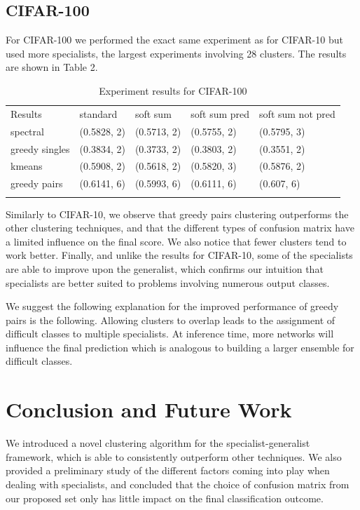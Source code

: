 \documentclass[12pt]{article}
\begin{document}
\subsection{CIFAR-100}\label{cifar-100}

For CIFAR-100 we performed the exact same experiment as for CIFAR-10 but
used more specialists, the largest experiments involving 28 clusters.
The results are shown in Table 2.

\begin{longtable}[c]{@{}lllll@{}}
\toprule\addlinespace
Results & standard & soft sum & soft sum pred & soft sum not pred
\\\addlinespace
\midrule\endhead
spectral & (0.5828, 2) & (0.5713, 2) & (0.5755, 2) & (0.5795, 3)
\\\addlinespace
greedy singles & (0.3834, 2) & (0.3733, 2) & (0.3803, 2) & (0.3551, 2)
\\\addlinespace
kmeans & (0.5908, 2) & (0.5618, 2) & (0.5820, 3) & (0.5876, 2)
\\\addlinespace
greedy pairs & (0.6141, 6) & (0.5993, 6) & (0.6111, 6) & (0.607, 6)
\\\addlinespace
\bottomrule
\addlinespace
\caption{Experiment results for CIFAR-100}
\end{longtable}

Similarly to CIFAR-10, we observe that greedy pairs clustering
outperforms the other clustering techniques, and that the different
types of confusion matrix have a limited influence on the final score.
We also notice that fewer clusters tend to work better. Finally, and
unlike the results for CIFAR-10, some of the specialists are able to
improve upon the generalist, which confirms our intuition that
specialists are better suited to problems involving numerous output
classes.

We suggest the following explanation for the improved performance of
greedy pairs is the following. Allowing clusters to overlap leads to the
assignment of difficult classes to multiple specialists. At inference
time, more networks will influence the final prediction which is
analogous to building a larger ensemble for difficult classes.

\section{Conclusion and Future Work}\label{conclusion-and-future-work}

We introduced a novel clustering algorithm for the specialist-generalist
framework, which is able to consistently outperform other techniques. We
also provided a preliminary study of the different factors coming into
play when dealing with specialists, and concluded that the choice of
confusion matrix from our proposed set only has little impact on the
final classification outcome.
\end{document}
